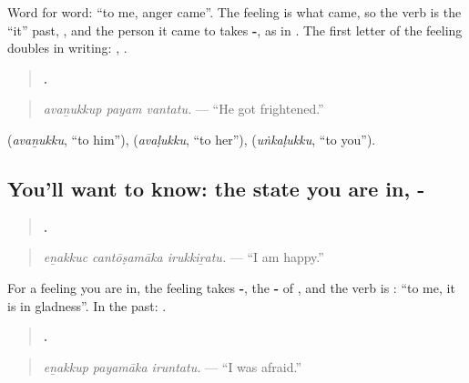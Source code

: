 Word for word: \textquotedblleft{}to me, anger came\textquotedblright{}. The feeling is what came, so the verb is the \textquotedblleft{}it\textquotedblright{} past, \textbf{}, and the person it came to takes \textbf{-}, as in \textbf{  }. The first letter of the feeling doubles in writing: \textbf{ }, \textbf{ }.

\begin{quote}
\textbf{  .}
\end{quote}

\begin{quote}
\emph{avaṉukkup payam vantatu.} — \textquotedblleft{}He got frightened.\textquotedblright{}
\end{quote}

\textbf{} (\emph{avaṉukku}, \textquotedblleft{}to him\textquotedblright{}), \textbf{} (\emph{avaḷukku}, \textquotedblleft{}to her\textquotedblright{}), \textbf{} (\emph{uṅkaḷukku}, \textquotedblleft{}to you\textquotedblright{}).

\subsection*{You'll want to know: the state you are in, - }
\begin{quote}
\textbf{  .}
\end{quote}

\begin{quote}
\emph{eṉakkuc cantōṣamāka irukkiṟatu.} — \textquotedblleft{}I am happy.\textquotedblright{}
\end{quote}

For a feeling you are in, the feeling takes \textbf{-}, the \textbf{-} of \textbf{}, and the verb is \textbf{}: \textquotedblleft{}to me, it is in gladness\textquotedblright{}. In the past: \textbf{}.

\begin{quote}
\textbf{  .}
\end{quote}

\begin{quote}
\emph{eṉakkup payamāka iruntatu.} — \textquotedblleft{}I was afraid.\textquotedblright{}
\end{quote}

